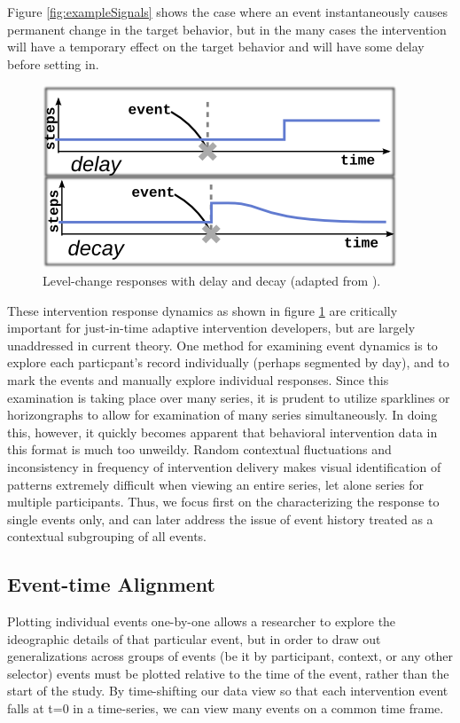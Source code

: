 Figure \ref{fig:exampleSignals} shows the case where an event instantaneously causes permanent change in the target behavior, but in the many cases the intervention will have a temporary effect on the target behavior and will have some delay before setting in.

\begin{figure}
\centering
\includegraphics[width=0.6\columnwidth]{./img/exampleDynamicComplications.png}
\caption{Level-change responses with delay and decay (adapted from \cite{glass1975}).}
\label{fig:exampleComplications}
\end{figure}

These intervention response dynamics as shown in figure \ref{fig:exampleComplications} are critically important for just-in-time adaptive intervention developers, but are largely unaddressed in current theory.
One method for examining event dynamics is to explore each particpant's record individually (perhaps segmented by day), and to mark the events and manually explore individual responses.
Since this examination is taking place over many series, it is prudent to utilize sparklines \cite{tufte2006} or horizongraphs \cite{reijner2008} to allow for examination of many series simultaneously.
In doing this, however, it quickly becomes apparent that behavioral intervention data in this format is much too unweildy.
Random contextual fluctuations and inconsistency in frequency of intervention delivery makes visual identification of patterns extremely difficult when viewing an entire series, let alone series for multiple participants. 
Thus, we focus first on the characterizing the response to single events only, and can later address the issue of event history treated as a contextual subgrouping of all events.

\subsection{Event-time Alignment}
Plotting individual events one-by-one allows a researcher to explore the ideographic details of that particular event, but in order to draw out generalizations across groups of events (be it by participant, context, or any other selector) events must be plotted relative to the time of the event, rather than the start of the study.
By time-shifting our data view so that each intervention event falls at t=0 in a time-series, we can view many events on a common time frame.

